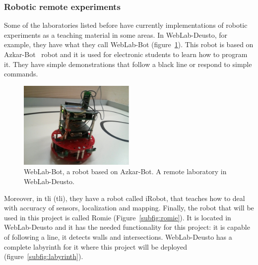 \subsubsection{Robotic remote experiments}

Some of the laboratories listed before have currently implementations of robotic experiments as a
teaching material in some areas. In WebLab-Deusto, for example, they have what they call WebLab-Bot
(figure~\ref{fig:weblab-bot}). This robot is based on Azkar-Bot~\cite{azkar_bot} robot and it is
used for electronic students to learn how to program it. They have simple demonstrations that follow
a black line or respond to simple commands.

\begin{figure}[ht]
	\centering
	\includegraphics[width=0.5\textwidth]{fig/weblab-bot.jpg}
	\caption{WebLab-Bot, a robot based on Azkar-Bot. A remote laboratory in WebLab-Deusto.}
	\label{fig:weblab-bot}
\end{figure}

Moreover, in \acrlong{tli} (\acrshort{tli}), they have a robot called iRobot, that teaches how to
deal with accuracy of sensors, localization and mapping. Finally, the robot that will be used in
this project is called Romie (Figure~\ref{subfig:romie}). It is located in WebLab-Deusto and it has
the needed functionality for this project: it is capable of following a line, it detects walls and
intersections. WebLab-Deusto has a complete labyrinth for it where this project will be deployed
(figure~\ref{subfig:labyrinth}).

